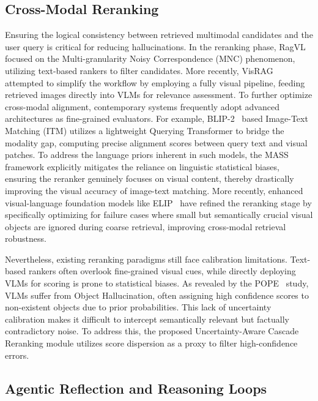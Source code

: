 \documentclass[a4paper, fleqn]{cas-dc}
\begin{document}
\subsection{Cross-Modal Reranking}

Ensuring the logical consistency between retrieved multimodal candidates and the user query is critical for reducing hallucinations.
In the reranking phase, RagVL~\cite{Chen2025} focused on the Multi-granularity Noisy Correspondence (MNC) phenomenon, utilizing text-based rankers to filter candidates.
More recently, VisRAG~\cite{Yu2025} attempted to simplify the workflow by employing a fully visual pipeline, feeding retrieved images directly into VLMs for relevance assessment.
To further optimize cross-modal alignment, contemporary systems frequently adopt advanced architectures as fine-grained evaluators.
For example, BLIP-2~\cite{Li2023BLIP2} based Image-Text Matching (ITM) utilizes a lightweight Querying Transformer to bridge the modality gap, computing precise alignment scores between query text and visual patches.
To address the language priors inherent in such models, the MASS~\cite{Chung2025} framework explicitly mitigates the reliance on linguistic statistical biases, ensuring the reranker genuinely focuses on visual content, thereby drastically improving the visual accuracy of image-text matching.
More recently, enhanced visual-language foundation models like ELIP~\cite{Zhan2025} have refined the reranking stage by specifically optimizing for failure cases where small but semantically crucial visual objects are ignored during coarse retrieval, improving cross-modal retrieval robustness.

Nevertheless, existing reranking paradigms still face calibration limitations.
Text-based rankers often overlook fine-grained visual cues, while directly deploying VLMs for scoring is prone to statistical biases.
As revealed by the POPE~\cite{Li2023} study, VLMs suffer from Object Hallucination, often assigning high confidence scores to non-existent objects due to prior probabilities.
This lack of uncertainty calibration makes it difficult to intercept semantically relevant but factually contradictory noise.
To address this, the proposed Uncertainty-Aware Cascade Reranking module utilizes score dispersion as a proxy to filter high-confidence errors.

\subsection{Agentic Reflection and Reasoning Loops}
\end{document}

